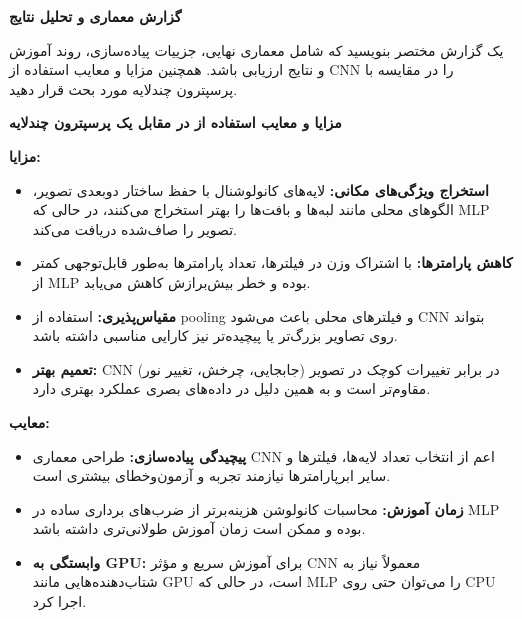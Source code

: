 \documentclass[12pt]{exam}
\begin{document}
\begin{questions}
		
		\question
		\textbf{گزارش معماری و تحلیل نتایج}
		
		یک گزارش مختصر بنویسید که شامل معماری نهایی، جزییات پیاده‌سازی، روند آموزش و نتایج ارزیابی باشد. همچنین مزایا و معایب استفاده از CNN را در مقایسه با پرسپترون چندلایه مورد بحث قرار دهید.
		
		\question
		\textbf{مزایا و معایب استفاده از  در مقابل یک پرسپترون چندلایه}
		
		\vspace{0.5em}
		\noindent
		\textbf{مزایا:}
		\begin{itemize}
			\item \textbf{استخراج ویژگی‌های مکانی:} لایه‌های کانولوشنال با حفظ ساختار دوبعدی تصویر، الگوهای محلی مانند لبه‌ها و بافت‌ها را بهتر استخراج می‌کنند، در حالی که MLP تصویر را صاف‌شده دریافت می‌کند.
			\item \textbf{کاهش پارامترها:} با اشتراک وزن در فیلترها، تعداد پارامترها به‌طور قابل‌توجهی کمتر از MLP بوده و خطر بیش‌برازش کاهش می‌یابد.
			\item \textbf{مقیاس‌پذیری:} استفاده از pooling و فیلترهای محلی باعث می‌شود CNN بتواند روی تصاویر بزرگ‌تر یا پیچیده‌تر نیز کارایی مناسبی داشته باشد.
			\item \textbf{تعمیم بهتر:} CNN در برابر تغییرات کوچک در تصویر (جابجایی، چرخش، تغییر نور) مقاوم‌تر است و به همین دلیل در داده‌های بصری عملکرد بهتری دارد.
		\end{itemize}
		
		\noindent
		\textbf{معایب:}
		\begin{itemize}
			\item \textbf{پیچیدگی پیاده‌سازی:} طراحی معماری CNN اعم از انتخاب تعداد لایه‌ها، فیلترها و سایر ابرپارامترها نیازمند تجربه و آزمون‌وخطای بیشتری است.
			\item \textbf{زمان آموزش:} محاسبات کانولوشن هزینه‌برتر از ضرب‌های برداری ساده در MLP بوده و ممکن است زمان آموزش طولانی‌تری داشته باشد.
			\item \textbf{وابستگی به GPU:} برای آموزش سریع و مؤثر CNN معمولاً نیاز به شتاب‌دهنده‌هایی مانند GPU است، در حالی که MLP را می‌توان حتی روی CPU اجرا کرد.
		\end{itemize}
		
	\end{questions}
	
\end{document}
